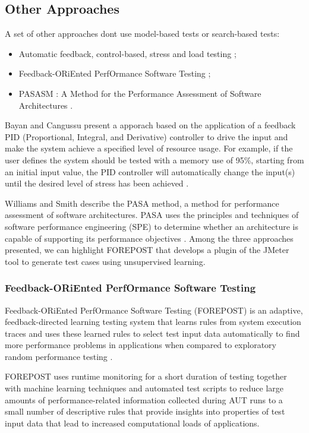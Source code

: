 \documentclass[espaco=umemeio,chapter=TITLE,twoside,openright]{abnt}
\begin{document}
\subsection{Other Approaches}

A set of other approaches dont use model-based tests or search-based tests:

\begin{itemize}
\item Automatic feedback, control-based, stress and load testing \cite{Bayan2008};
\item Feedback-ORiEnted PerfOrmance Software Testing \cite{Luo2015};
\item PASASM : A Method for the
Performance Assessment of Software Architectures \cite{Williams2002}.
\end{itemize}

Bayan and Cangussu present a apporach based on the application of a feedback
PID (Proportional, Integral, and Derivative) controller to drive the input and make the system achieve a specified level of resource usage. For example, if the user defines the system should be tested with a memory use of 95\%, starting from an initial input value, the PID controller will automatically change the input(s) until the desired level of stress has been achieved \cite{Bayan2008}.

Williams and Smith describe the PASA method, a method for performance assessment of software architectures. PASA uses the principles and techniques of software performance engineering (SPE) to determine whether an architecture is capable of supporting its performance objectives  \cite{Williams2002}. Among the three approaches presented, we can highlight FOREPOST that develops a plugin of the JMeter tool to generate test cases using unsupervised learning.

\subsubsection{Feedback-ORiEnted PerfOrmance Software Testing}

Feedback-ORiEnted PerfOrmance Software Testing (FOREPOST) is an adaptive, feedback-directed learning testing system that learns rules from system execution traces and uses these learned rules to select test input data automatically to find more performance problems in applications when compared to exploratory random performance testing \cite{Grechanik2012}.

FOREPOST uses runtime monitoring for a short duration of testing together with machine learning techniques and automated test scripts to reduce large amounts of performance-related information collected during AUT runs to a small number of descriptive rules that provide insights into properties of test input data that lead to increased computational loads of applications.
\end{document}
